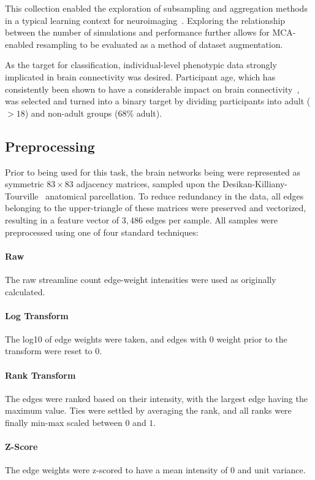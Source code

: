 \documentclass[10pt]{SelfArx} %
\begin{document}
This collection enabled the exploration of subsampling and aggregation methods in a typical learning context for
neuroimaging~\cite{Dimitriadis2017-pd,Buchanan2014-pm}. Exploring the relationship between the number of simulations
and performance further allows for MCA-enabled resampling to be evaluated as a method of dataset augmentation.

As the target for classification, individual-level phenotypic data strongly implicated in brain connectivity was
desired. Participant age, which has consistently been shown to have a considerable impact on brain
connectivity~\cite{Meier2012-ve,Wu2012-uc,Bookheimer2019-ti,Zhao2015-rm}, was selected and turned into a binary target
by dividing participants into adult ($>18$) and non-adult groups ($68\%$ adult). 

\subsection*{Preprocessing}
Prior to being used for this task, the brain networks being were represented as symmetric $83 \times 83$ adjacency
matrices, sampled upon the Desikan-Killiany-Tourville~\cite{Klein2012-vi} anatomical parcellation. To reduce redundancy
in the data, all edges belonging to the upper-triangle of these matrices were preserved and vectorized, resulting in a
feature vector of $3,486$ edges per sample. All samples were preprocessed using one of four standard techniques:

\paragraph{Raw} The raw streamline count edge-weight intensities were used as originally calculated.

\paragraph{Log Transform} The log10 of edge weights were taken, and edges with $0$ weight prior to the transform were
reset to $0$.

\paragraph{Rank Transform} The edges were ranked based on their intensity, with the largest edge having the maximum
value. Ties were settled by averaging the rank, and all ranks were finally min-max scaled between $0$ and $1$.

\paragraph{Z-Score} The edge weights were z-scored to have a mean intensity of $0$ and unit variance.
\end{document}
